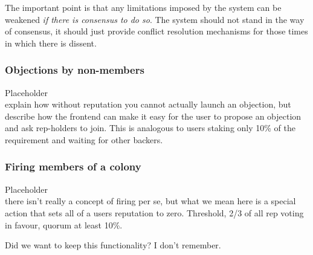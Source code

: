 The important point is that any limitations imposed by the system can be weakened \emph{if there is consensus to do so}. The system should not stand in the way of consensus, it should just provide conflict resolution mechanisms for those times in which there is dissent.


\subsubsection{Objections by non-members}

%
Placeholder\\
explain how without reputation you cannot actually launch an objection, but describe how the frontend can make it easy for the user to propose an objection and ask rep-holders to join. This is analogous to users staking only 10\% of the requirement and waiting for other backers.
%

\subsubsection{Firing members of a colony}

%
Placeholder\\
there isn't really a concept of firing per se, but what we mean here is a special action that sets all of a users reputation to zero.
Threshold, 2/3 of all rep voting in favour, quorum at least 10\%. 
%

Did we want to keep this functionality? I don't remember.

